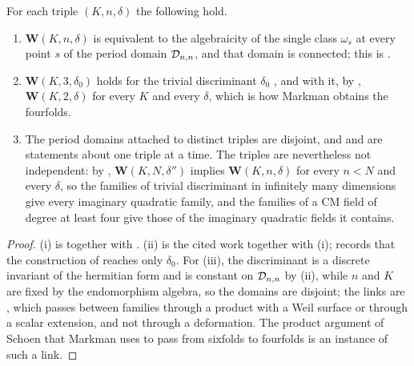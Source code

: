 \begin{proposition}\label{prop:separate}
For each triple $(K,n,\delta)$ the following hold.
\begin{enumerate}[label=\textup{(\roman*)},leftmargin=2.6em]
\item $\mathbf{W}(K,n,\delta)$ is equivalent to the algebraicity of the single
  class $\omega_{s}$ at every point $s$ of the period domain $\mathcal{D}_{n,n}$, and
  that domain is connected; this is .
\item $\mathbf{W}(K,3,\delta_{0})$ holds for the trivial discriminant
  $\delta_{0}$ \cite{Mar25a,Mar25b}, and with it, by ,
  $\mathbf{W}(K,2,\delta)$ for every $K$ and every $\delta$, which is how
  Markman obtains the fourfolds.
\item The period domains attached to distinct triples are disjoint, and
   and  are statements about one
  triple at a time. The triples are nevertheless not independent: by
  , $\mathbf{W}(K,N,\delta'')$ implies
  $\mathbf{W}(K,n,\delta)$ for every $n<N$ and every $\delta$, so the families
  of trivial discriminant in infinitely many dimensions give every imaginary
  quadratic family, and the families of a CM field of degree at least four
  give those of the imaginary quadratic fields it contains.
\end{enumerate}
\end{proposition}

\begin{proof}
(i) is  together with . (ii) is the
cited work together with (i); 
records that the construction of  reaches only $\delta_{0}$.
For (iii), the discriminant is a discrete invariant of the hermitian form and
is constant on $\mathcal{D}_{n,n}$ by (ii), while $n$ and $K$ are
fixed by the endomorphism algebra, so the domains are disjoint; the links are
, which passes between families through a product with a
Weil surface or through a scalar extension, and not through a deformation.
The product argument of Schoen that Markman uses to pass from sixfolds to
fourfolds is an instance of such a link.
\end{proof}

